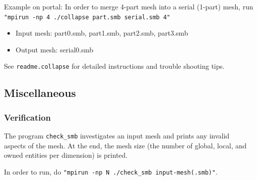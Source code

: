 Example on portal:
\newline
In order to merge 4-part mesh into a serial (1-part) mesh, run
\texttt{"mpirun -np 4 ./collapse part.smb serial.smb 4"}
\begin{itemize}
\item	Input mesh: part0.smb, part1.smb, part2.smb, part3.smb
\item	Output mesh: serial0.smb
\end{itemize}

See \texttt{readme.collapse} for detailed instructions and trouble shooting tips.

\subsection{Miscellaneous}
\label{ch:mesh-misc}

\subsubsection{Verification}

The program \texttt{check\_smb} investigates an input mesh and prints any invalid aspects of the mesh. At the end, the mesh size (the number of global, local, and owned entities per dimension) is printed. 

In order to run, do \texttt{"mpirun -np N ./check\_smb input-mesh(.smb)"}.
